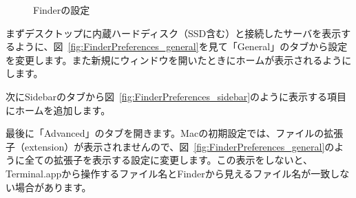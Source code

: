 \begin{figure}
  \centering
  \hfill%
  \hfill%
  \caption{Finderの設定}
\label{fig:FinderPreferences}
\end{figure}

まずデスクトップに内蔵ハードディスク（SSD含む）と接続したサーバを表示するように、図~\ref{fig:FinderPreferences_general}を見て「General」のタブから設定を変更します。また新規にウィンドウを開いたときにホームが表示されるようにします。

次にSidebarのタブから図~\ref{fig:FinderPreferences_sidebar}のように表示する項目にホームを追加します。

最後に「Advanced」のタブを開きます。Macの初期設定では、ファイルの拡張子（extension）が表示されませんので、図~\ref{fig:FinderPreferences_general}のように全ての拡張子を表示する設定に変更します。この表示をしないと、Terminal.appから操作するファイル名とFinderから見えるファイル名が一致しない場合があります。

